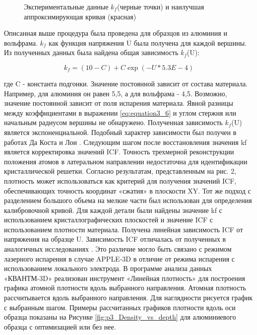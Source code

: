 \begin{figure}[htb]
	\caption{Экспериментальные данные $k_f$(черные точки) и наилучшая аппроксимирующая кривая (красная)}
	\label{fig:p3_kf_vs_voltage}
\end{figure} 

Описанная выше процедура была проведена для образцов из алюминия и вольфрама. $k_f$ как функция напряжения U была получена для каждой вершины. Из полученных данных была найдена общая зависимость $k_f$(U):

\begin{equation}
	\label{eq:equation3_6}
	k_f = (10 - C) + C\exp(- U * 5.3E-4)
\end{equation}

где C - константа подгонки. Значение постоянной зависит от состава материала. Например, для алюминия он равен 5,5, а для вольфрама - 4,5. Возможно, значение постоянной зависит от поля испарения материала. Явной разницы между коэффициентами в выражении \cref{eq:equation3_6} и углом стержня или начальным радиусом вершины не обнаружено. Полученная зависимость $k_f$(U) является экспоненциальной. Подобный характер зависимости был получен в работах Да Коста \cite{Hatzoglou19} и Лои \cite{Loi13}.
Следующим шагом после восстановления значения kf является корректировка значений ICF. Точность трехмерной реконструкции положения атомов в латеральном направлении недостаточна для идентификации кристаллической решетки. Согласно результатам, представленным на рис. 2, плотность может использоваться как критерий для получения значений ICF, обеспечивающих точность координат «сжатия» в плоскости XY. Тот же подход с разделением большого объема на мелкие части был использован для определения калибровочной кривой. Для каждой детали были найдены значение kf с использованием кристаллографических плоскостей и значение ICF с использованием плотности материала. Получена линейная зависимость ICF от напряжения на образце U. Зависимость ICF отличалась от полученных в аналогичных исследованиях \cite{Hatzoglou19, Gault11_Loi}. Это различие могло быть связано с режимом лазерного испарения в случае APPLE-3D в отличие от режима испарения с использованием локального электрода.
В программе анализа данных «КВАНТМ-3D» реализован инструмент «Линейная плотность» для построения графика атомной плотности вдоль выбранного направления. Атомная плотность рассчитывается вдоль выбранного направления. Для наглядности рисуется график с выбранным шагом. Примеры рассчитанных графиков плотности вдоль оси образца показаны на Рисунке \cref{fig:p3_Density_vs_depth} для алюминиевого образца с оптимизацией или без нее.

